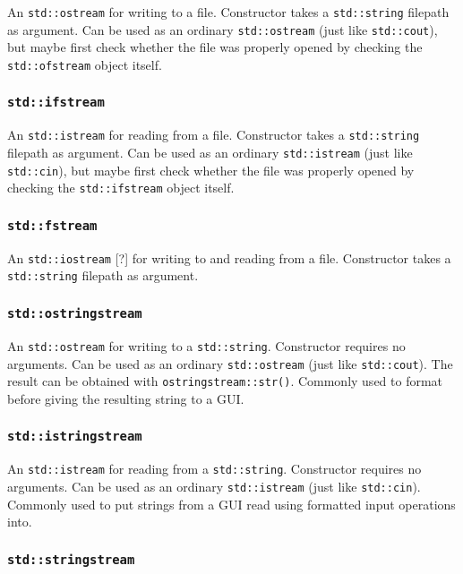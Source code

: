 \documentclass[8pt, table, xcdraw]{article}%
\begin{document}
An \lstinline{std::ostream} for writing to a file. Constructor takes a \lstinline{std::string} filepath as argument. Can be used as an ordinary \lstinline{std::ostream} (just like \lstinline{std::cout}), but maybe first check whether the file was properly opened by checking the \lstinline{std::ofstream} object itself.

\subsubsection{\lstinline{std::ifstream}}

An \lstinline{std::istream} for reading from a file. Constructor takes a \lstinline{std::string} filepath as argument. Can be used as an ordinary \lstinline{std::istream} (just like \lstinline{std::cin}), but maybe first check whether the file was properly opened by checking the \lstinline{std::ifstream} object itself.

\subsubsection{\lstinline{std::fstream}}

An \lstinline{std::iostream} [?] for writing to and reading from a file. Constructor takes a \lstinline{std::string} filepath as argument.

\subsubsection{\lstinline{std::ostringstream}}

An \lstinline{std::ostream} for writing to a \lstinline{std::string}. Constructor requires no arguments. Can be used as an ordinary \lstinline{std::ostream} (just like \lstinline{std::cout}). The result can be obtained with \lstinline{ostringstream::str()}. Commonly used to format before giving the resulting string to a GUI.

\subsubsection{\lstinline{std::istringstream}}

An \lstinline{std::istream} for reading from a \lstinline{std::string}. Constructor requires no arguments. Can be used as an ordinary \lstinline{std::istream} (just like \lstinline{std::cin}). Commonly used to put strings from a GUI read using formatted input operations into.

\subsubsection{\lstinline{std::stringstream}}
\end{document}
